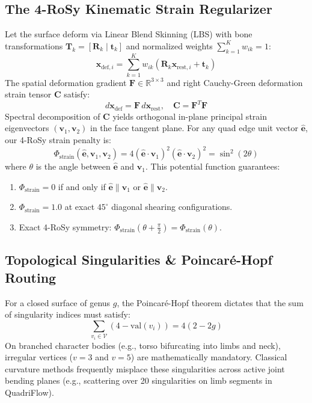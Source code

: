\documentclass[acmtog,nonacm]{acmart}
\begin{document}
\subsection{The 4-RoSy Kinematic Strain Regularizer}
Let the surface deform via Linear Blend Skinning (LBS) with bone transformations $\mathbf{T}_k = [\mathbf{R}_k \mid \mathbf{t}_k]$ and normalized weights $\sum_{k=1}^K w_{ik} = 1$:
\begin{equation}
\mathbf{x}_{\text{def}, i} = \sum_{k=1}^K w_{ik} \left( \mathbf{R}_k \mathbf{x}_{\text{rest}, i} + \mathbf{t}_k \right)
\end{equation}
The spatial deformation gradient $\mathbf{F} \in \mathbb{R}^{3 \times 3}$ and right Cauchy-Green deformation strain tensor $\mathbf{C}$ satisfy:
\begin{equation}
d\mathbf{x}_{\text{def}} = \mathbf{F} \, d\mathbf{x}_{\text{rest}}, \quad \mathbf{C} = \mathbf{F}^T \mathbf{F}
\end{equation}
Spectral decomposition of $\mathbf{C}$ yields orthogonal in-plane principal strain eigenvectors $(\mathbf{v}_1, \mathbf{v}_2)$ in the face tangent plane. For any quad edge unit vector $\hat{\mathbf{e}}$, our 4-RoSy strain penalty is:
\begin{equation}
\Phi_{\text{strain}}(\hat{\mathbf{e}}, \mathbf{v}_1, \mathbf{v}_2) = 4 (\hat{\mathbf{e}} \cdot \mathbf{v}_1)^2 (\hat{\mathbf{e}} \cdot \mathbf{v}_2)^2 = \sin^2(2\theta)
\end{equation}
where $\theta$ is the angle between $\hat{\mathbf{e}}$ and $\mathbf{v}_1$. This potential function guarantees:
\begin{enumerate}
    \item $\Phi_{\text{strain}} = 0$ if and only if $\hat{\mathbf{e}} \parallel \mathbf{v}_1$ or $\hat{\mathbf{e}} \parallel \mathbf{v}_2$.
    \item $\Phi_{\text{strain}} = 1.0$ at exact $45^\circ$ diagonal shearing configurations.
    \item Exact 4-RoSy symmetry: $\Phi_{\text{strain}}(\theta + \frac{\pi}{2}) = \Phi_{\text{strain}}(\theta)$.
\end{enumerate}

\subsection{Topological Singularities \& Poincaré-Hopf Routing}
For a closed surface of genus $g$, the Poincaré-Hopf theorem dictates that the sum of singularity indices must satisfy:
\begin{equation}
\sum_{v_i \in \mathcal{V}} (4 - \text{val}(v_i)) = 4(2 - 2g)
\end{equation}
On branched character bodies (e.g., torso bifurcating into limbs and neck), irregular vertices ($v=3$ and $v=5$) are mathematically mandatory. Classical curvature methods frequently misplace these singularities across active joint bending planes (e.g., scattering over 20 singularities on limb segments in QuadriFlow).
\end{document}
